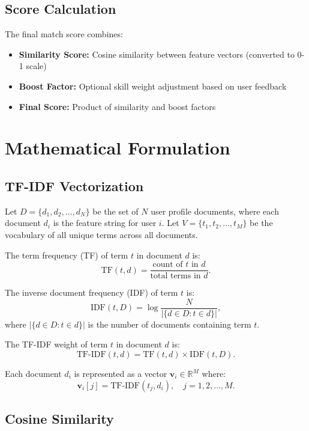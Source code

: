 \documentclass[12pt,a4paper]{report}
\let\origsection\section
\renewcommand{\section}{\needspace{4\baselineskip}\origsection}
\let\origsubsection\subsection
\renewcommand{\subsection}{\needspace{4\baselineskip}\origsubsection}
\begin{document}
\subsection{Score Calculation}

The final match score combines:
\begin{itemize}[noitemsep]
    \item \textbf{Similarity Score:} Cosine similarity between feature vectors (converted to 0-1 scale)
    \item \textbf{Boost Factor:} Optional skill weight adjustment based on user feedback
    \item \textbf{Final Score:} Product of similarity and boost factors
\end{itemize}

\section{Mathematical Formulation}

\subsection{TF-IDF Vectorization}

Let $D = \{d_1, d_2, \ldots, d_N\}$ be the set of $N$ user profile documents, where each document $d_i$ is the feature string for user $i$. Let $V = \{t_1, t_2, \ldots, t_M\}$ be the vocabulary of all unique terms across all documents.

\medskip

\noindent
The term frequency (TF) of term $t$ in document $d$ is:
\[
\text{TF}(t,d) = \frac{\text{count of } t \text{ in } d}{\text{total terms in } d}.
\]

\noindent
The inverse document frequency (IDF) of term $t$ is:
\[
\text{IDF}(t,D) = \log\frac{N}{|\{d \in D : t \in d\}|},
\]
where $|\{d \in D : t \in d\}|$ is the number of documents containing term $t$.

\noindent
The TF-IDF weight of term $t$ in document $d$ is:
\[
\text{TF-IDF}(t,d) = \text{TF}(t,d) \times \text{IDF}(t,D).
\]

\noindent
Each document $d_i$ is represented as a vector $\mathbf{v}_i \in \mathbb{R}^M$ where:
\[
\mathbf{v}_i[j] = \text{TF-IDF}(t_j, d_i), \quad j = 1, 2, \ldots, M.
\]

\subsection{Cosine Similarity}
\end{document}
